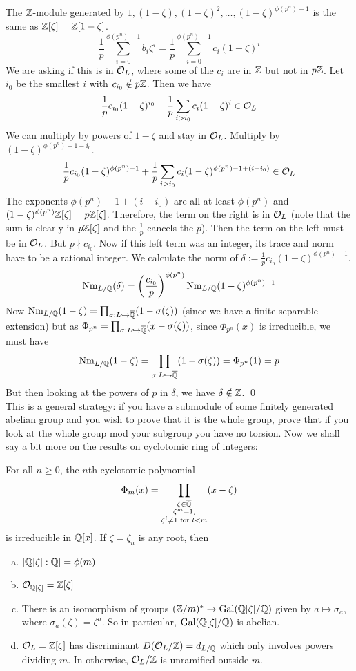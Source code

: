 The $\mathbb{Z}$-module generated by $1,(1-\zeta),(1-\zeta)^2,\ldots,(1-\zeta)^{\phi(p^n)-1}$ is the same as $\mathbb{Z}[\zeta]=\mathbb{Z}[1-\zeta]$. 
	\[
	\dfrac{1}{p} \sum_{i=0}^{\phi(p^n)-1} b_i \zeta^i= \dfrac{1}{p} \sum_{i=0}^{\phi(p^n)-1} c_i (1-\zeta)^i
	\]
We are asking if this is in $\mathcal{O}_L$, where some of the $c_i$ are in $\mathbb{Z}$ but not in $p\mathbb{Z}$. Let $i_0$ be the smallest $i$ with $c_{i_0} \notin p \mathbb{Z}$. Then we have
	\[
	\dfrac{1}{p} c_{i_0} (1-\zeta)^{i_0} + \dfrac{1}{p} \sum_{i>i_0} c_i (1-\zeta)^i \in \mathcal{O}_L
	\]
We can multiply by powers of $1-\zeta$ and stay in $\mathcal{O}_L$. Multiply by $(1-\zeta)^{\phi(p^n)-1-i_0}$. 
	\[
	\dfrac{1}{p} c_{i_0} (1-\zeta)^{\phi(p^n)-1} + \dfrac{1}{p} \sum_{i>i_0} c_i (1-\zeta)^{\phi(p^n)-1+(i-i_0)} \in \mathcal{O}_L
	\]
The exponents $\phi(p^n)-1+(i-i_0)$ are all at least $\phi(p^n)$ and $(1-\zeta)^{\phi(p^n)} \mathbb{Z}[\zeta]=p\mathbb{Z}[\zeta]$. Therefore, the term on the right is in $\mathcal{O}_L$ (note that the sum is clearly in $p\mathbb{Z}[\zeta]$ and the $\frac{1}{p}$ cancels the $p$). Then the term on the left must be in $\mathcal{O}_L$. But $p \nmid c_{i_0}$. Now if this left term was an integer, its trace and norm have to be a rational integer. We calculate the norm of $\delta:=\frac{1}{p} c_{i_0} (1-\zeta)^{\phi(p^n)-1}$.
	\[
	\text{Nm}_{L/\mathbb{Q}}(\delta)= \left(\dfrac{c_{i_0}}{p}\right)^{\phi(p^n)} \text{Nm}_{L/\mathbb{Q}}(1-\zeta)^{\phi(p^n)-1}
	\]
Now $\text{Nm}_{L/\mathbb{Q}}(1-\zeta)=\prod_{\sigma: L \hookrightarrow \overline{\mathbb{Q}}} (1-\sigma(\zeta))$ (since we have a finite separable extension) but as  $\Phi_{p^n}=\prod_{\sigma: L \hookrightarrow \overline{\mathbb{Q}}} (x-\sigma(\zeta))$, since $\Phi_{p^n}(x)$ is irreducible, we must have
	\[
	\text{Nm}_{L/\mathbb{Q}}(1-\zeta)=\prod_{\sigma: L \hookrightarrow \overline{\mathbb{Q}}} (1-\sigma(\zeta))= \Phi_{p^n}(1)=p
	\] 
But then looking at the powers of $p$ in $\delta$, we have $\delta \notin \mathbb{Z}$. \qed \\

This is a general strategy: if you have a submodule of some finitely generated abelian group and you wish to prove that it is the whole group, prove that if you look at the whole group mod your subgroup you have no torsion. Now we shall say a bit more on the results on cyclotomic ring of integers:

\begin{prop}
For all $n \geq 0$, the $n$th cyclotomic polynomial 
	\[
	\Phi_m(x)=\prod_{\substack{\zeta \in \overline{\mathbb{Q}} \\\zeta^m=1, \\ \zeta^l \neq 1 \text{ for }l<m}} (x-\zeta)
	\]
is irreducible in $\mathbb{Q}[x]$. If $\zeta=\zeta_n$ is any root, then
	\begin{enumerate}[(a)]
	\item $[\mathbb{Q}[\zeta]:\mathbb{Q}]=\phi(m)$
	\item $\mathcal{O}_{\mathbb{Q}[\zeta]}=\mathbb{Z}[\zeta]$
	\item There is an isomorphism of groups $(\mathbb{Z}/m)^* \to \operatorname{Gal}(\mathbb{Q}[\zeta]/\mathbb{Q})$ given by $a \mapsto \sigma_a$, where $\sigma_a(\zeta)=\zeta^a$. So in particular, $\operatorname{Gal}(\mathbb{Q}[\zeta]/\mathbb{Q})$ is abelian. 
	\item $\mathcal{O}_L=\mathbb{Z}[\zeta]$ has discriminant $D(\mathcal{O}_L/\mathbb{Z})=d_{L/\mathbb{Q}}$ which only involves powers dividing $m$. In otherwise, $\mathcal{O}_L/\mathbb{Z}$ is unramified outside $m$. 
	\end{enumerate}
\end{prop}


